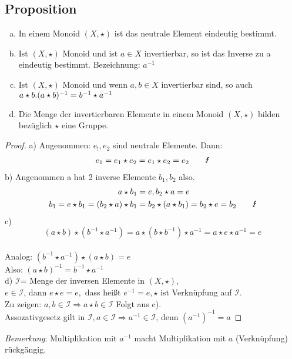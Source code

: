 \subsection{Proposition}\label{sec:1.5}
\begin{enumerate}[a)]
\item In einem Monoid $(X,\star)$ ist das neutrale Element eindeutig bestimmt.
\item Ist $(X,\star)$ Monoid und ist $a \in X$ invertierbar, so ist das Inverse zu a eindeutig bestimmt. Bezeichnung: $a^{-1}$
\item Ist $(X, \star)$ Monoid und wenn $a,b \in X$ invertierbar sind, so auch $a \star b.\\
(a \star b)^{-1} = b^{-1} \star a^{-1}$
\item Die Menge der invertierbaren Elemente in einem Monoid $(X, \star)$ bilden bezüglich $\star$ eine Gruppe.
\end{enumerate}
\begin{proof}
a) Angenommen: $e_!,e_2$ sind neutrale Elemente. Dann:
\begin{align}
e_1 = e_1 \star e_2 = e_1 \star e_2 = e_2 \qquad{\text{\Lightning}}\notag
\end{align}
b) Angenommen a hat 2 inverse Elemente $b_1, b_2$ also.
\begin{align}
a \star b_1 &= e, b_2 \star a = e \notag\\
b_1 = e \star b_1 = (b_2 \star a) \star b_1 &= b_2 \star (a \star b_1) = b_2 \star e = b_2 \qquad \text{\Lightning} \notag
\end{align}
c) $$(a \star b)\star (b^{-1} \star a^{-1}) = a \star (b \star b^{-1}) \star a^{-1} = a \star e \star a^{-1} = e$$\\
Analog: $(b^{-1} \star a^{-1})\star (a \star b) =e $\\
Also: $(a \star b)^{-1} = b^{-1} \star a^{-1}$\\
d) $\mathcal{I}$= Menge der inversen Elemente in $(X, \star)$,\\ $e \in \mathcal{I}$, dann $e \star e = e,$ dass hei\ss t $e^{-1} = e, \star$ ist Verknüpfung auf $\mathcal{I}$.\\
Zu zeigen: $a,b \in \mathcal{I} \Rightarrow a \star b \in \mathcal{I}$ Folgt aus c).\\
Assozativgesetz gilt in $\mathcal{I}, a \in \mathcal{I} \Rightarrow a^{-1} \in \mathcal{I}$, denn $(a^{-1})^{-1} = a$
\end{proof}
\emph{Bemerkung}: Multiplikation mit $a^{-1}$ macht Multiplikation mit $a$ (Verknüpfung) rückgängig.
